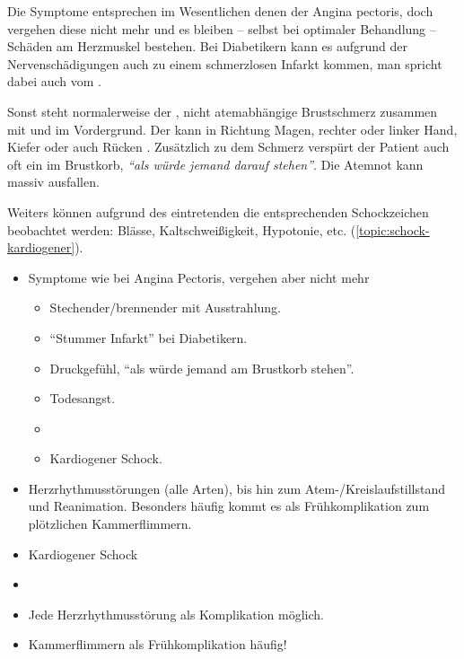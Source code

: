 {
Die Symptome entsprechen im Wesentlichen denen der Angina pectoris, doch
vergehen diese nicht mehr und es bleiben -- selbst bei optimaler Behandlung --
Schäden am Herzmuskel bestehen. Bei Diabetikern kann es aufgrund der
Nervenschädigungen auch zu einem schmerzlosen Infarkt kommen, man
spricht dabei auch vom .

Sonst steht normalerweise der , nicht atemabhängige
Brustschmerz zusammen mit  und  im Vordergrund. Der
 kann in Richtung Magen, rechter oder linker Hand, Kiefer
oder auch Rücken . Zusätzlich zu dem
Schmerz verspürt der Patient auch oft ein  im
Brustkorb, \emph{"`als würde jemand darauf stehen"'}. Die
Atemnot kann massiv ausfallen. 

Weiters können aufgrund des eintretenden  die entsprechenden Schockzeichen beobachtet
werden: Blässe, Kaltschweißigkeit, Hypotonie, etc.
(\ref{topic:schock-kardiogener}).
}{
\begin{itemize}
  \item Symptome wie bei Angina Pectoris, vergehen aber nicht
  mehr
  \begin{itemize}
    \item Stechender/brennender  mit Ausstrahlung.
    \item "`Stummer Infarkt"' bei Diabetikern.
    \item Druckgefühl, "`als würde jemand am
    Brustkorb stehen"'.
    \item Todesangst.
    \item {}
    \item Kardiogener Schock.
  \end{itemize}
\end{itemize}
}{}{}{}
  
{
\begin{itemize}
  \item Herzrhythmusstörungen (alle Arten), bis hin
  zum Atem-/Kreislaufstillstand und Reanimation.
  Besonders häufig kommt es als Frühkomplikation zum
  plötzlichen Kammerflimmern.
  \item Kardiogener Schock 
\end{itemize}

}{
\begin{itemize}
  \item {}
  \item Jede Herzrhythmusstörung als Komplikation möglich.
  \item Kammerflimmern als Frühkomplikation häufig!
\end{itemize}

}{}{}{}


